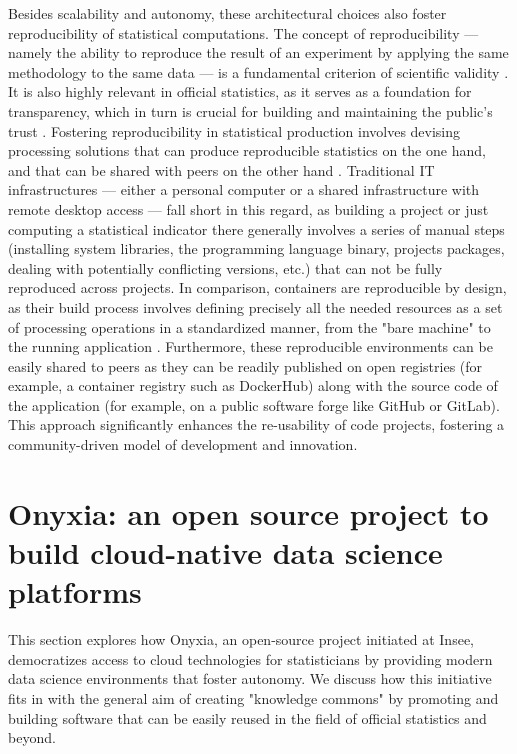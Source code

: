 \documentclass[graybox]{svmult}
\begin{document}
Besides scalability and autonomy, these architectural choices also foster reproducibility of statistical computations. The concept of reproducibility — namely the ability to reproduce the result of an experiment by applying the same methodology to the same data — is a fundamental criterion of scientific validity \cite{mcnutt2014reproducibility}. It is also highly relevant in official statistics, as it serves as a foundation for transparency, which in turn is crucial for building and maintaining the public's trust \cite{eurocodepractice2018}. Fostering reproducibility in statistical production involves devising processing solutions that can produce reproducible statistics on the one hand, and that can be shared with peers on the other hand \cite{ntts2019reproducibility}. Traditional IT infrastructures — either a personal computer or a shared infrastructure with remote desktop access — fall short in this regard, as building a project or just computing a statistical indicator there generally involves a series of manual steps (installing system libraries, the programming language binary, projects packages, dealing with potentially conflicting versions, etc.) that can not be fully reproduced across projects. In comparison, containers are reproducible by design, as their build process involves defining precisely all the needed resources as a set of processing operations in a standardized manner, from the "bare machine" to the running application \cite{moreau2023containers}. Furthermore, these reproducible environments can be easily shared to peers as they can be readily published on open registries (for example, a container registry such as DockerHub) along with the source code of the application (for example, on a public software forge like GitHub or GitLab). This approach significantly enhances the re-usability of code projects, fostering a community-driven model of development and innovation.




\section{Onyxia: an open source project to build cloud-native data science platforms}
\label{sec:implementation}

This section explores how Onyxia, an open-source project initiated at Insee, democratizes access to cloud technologies for statisticians by providing modern data science environments that foster autonomy. We discuss how this initiative fits in with the general aim of creating "knowledge commons" by promoting and building software that can be easily reused in the field of official statistics and beyond.
\end{document}
